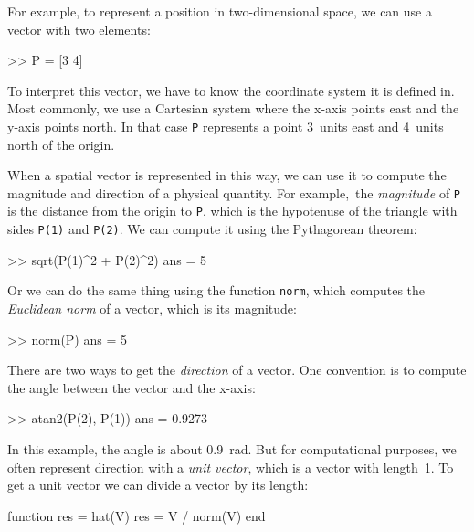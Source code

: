 
For example, to represent a position in two-dimensional space, we can use a vector with two elements:

\begin{code}
>> P = [3 4]
\end{code}

To interpret this vector, we have to know the coordinate system it is defined in.  Most commonly, we use a Cartesian system where the x-axis points east and the y-axis points north.  In that case \lstinline{P} represents a point 3~units east and 4~units north of the origin.


When a spatial vector is represented in this way, we can use it to compute the magnitude and direction of a physical quantity.
For example,~the \emph{magnitude} of \lstinline{P} is the distance from the origin to \lstinline{P}, which is the hypotenuse of the triangle with sides \lstinline{P(1)} and \lstinline{P(2)}.
We can compute it using the Pytha\-gorean theorem:

\begin{code}
>> sqrt(P(1)^2 + P(2)^2)
ans = 5
\end{code}

Or we can do the same thing using the function \lstinline{norm}, which computes the
\emph{Euclidean norm} of a vector, which is its magnitude:


\begin{code}
>> norm(P)
ans = 5
\end{code}

There are two ways to get the \emph{direction} of a vector.  One convention is to compute the angle between the vector and the x-axis:

\begin{code}
>> atan2(P(2), P(1))
ans = 0.9273
\end{code}

In this example, the angle is about \SI{0.9}{\radian}.  But for computational purposes, we often represent direction with a \emph{unit vector}, which is a vector with length~1.  To get a unit vector we can divide a vector by its length:

\begin{code}
function res = hat(V)
    res = V / norm(V)
end
\end{code}

